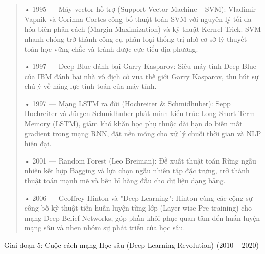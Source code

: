 \begin{quote}
• 1995 --- Máy vector hỗ trợ (Support Vector Machine -- SVM): Vladimir
Vapnik và Corinna Cortes công bố thuật toán SVM với nguyên lý tối đa hóa
biên phân cách (Margin Maximization) và kỹ thuật Kernel Trick. SVM nhanh
chóng trở thành công cụ phân loại thống trị nhờ cơ sở lý thuyết toán học
vững chắc và tránh được cực tiểu địa phương.

• 1997 --- Deep Blue đánh bại Garry Kasparov: Siêu máy tính Deep Blue
của IBM đánh bại nhà vô địch cờ vua thế giới Garry Kasparov, thu hút sự
chú ý về năng lực tính toán của máy tính.

• 1997 --- Mạng LSTM ra đời (Hochreiter \& Schmidhuber): Sepp Hochreiter
và Jürgen Schmidhuber phát minh kiến trúc Long Short-Term Memory (LSTM),
giảm khó khăn học phụ thuộc dài hạn do biến mất gradient trong mạng RNN,
đặt nền móng cho xử lý chuỗi thời gian và NLP hiện đại.

• 2001 --- Random Forest (Leo Breiman): Đề xuất thuật toán Rừng ngẫu
nhiên kết hợp Bagging và lựa chọn ngẫu nhiên tập đặc trưng, trở thành
thuật toán mạnh mẽ và bền bỉ hàng đầu cho dữ liệu dạng bảng.

• 2006 --- Geoffrey Hinton và "Deep Learning": Hinton cùng các cộng sự
công bố kỹ thuật tiền huấn luyện từng lớp (Layer-wise Pre-training) cho
mạng Deep Belief Networks, góp phần khôi phục quan tâm đến huấn luyện
mạng sâu và nhen nhóm sự phát triển của học sâu.
\end{quote}

Giai đoạn 5: Cuộc cách mạng Học sâu (Deep Learning Revolution) (2010 --
2020)

